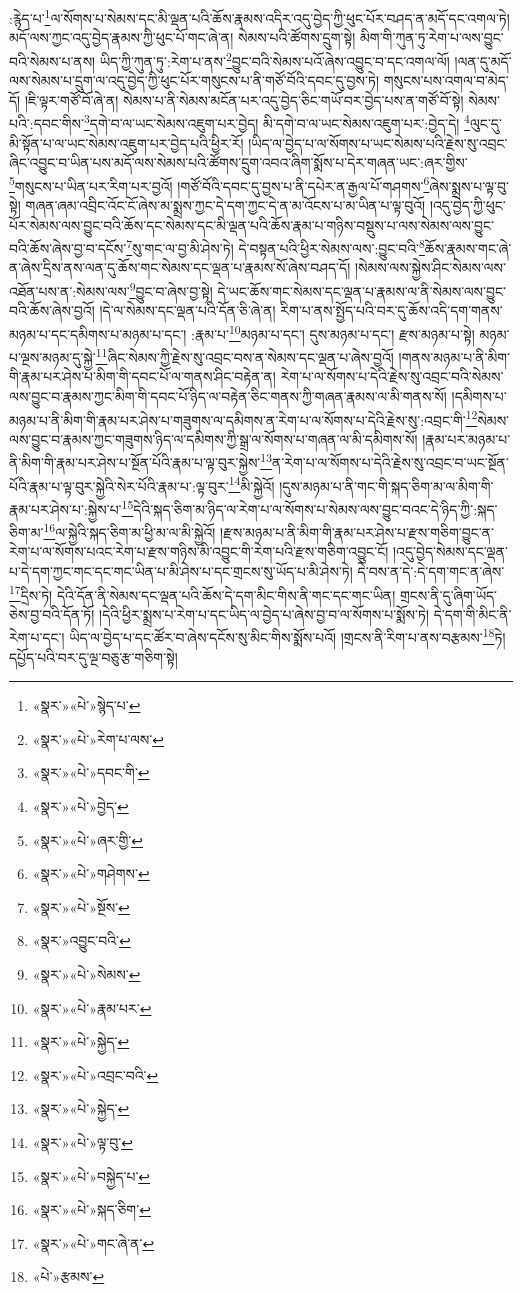 :རྙེད་པ་\footnote{«སྣར་»«པེ་»སྙེད་པ་}ལ་སོགས་པ་སེམས་དང་མི་ལྡན་པའི་ཆོས་རྣམས་འདིར་འདུ་བྱེད་ཀྱི་ཕུང་པོར་བཤད་ན་མདོ་དང་འགལ་ཏེ། མདོ་ལས་ཀྱང་འདུ་བྱེད་རྣམས་ཀྱི་ཕུང་པོ་གང་ཞེ་ན། སེམས་པའི་ཚོགས་དྲུག་སྟེ། མིག་གི་ཀུན་ཏུ་རེག་པ་ལས་བྱུང་བའི་སེམས་པ་ནས། ཡིད་ཀྱི་ཀུན་ཏུ་:རེག་པ་ནས་\footnote{«སྣར་»«པེ་»རེག་པ་ལས་}བྱུང་བའི་སེམས་པའོ་ཞེས་འབྱུང་བ་དང་འགལ་ལོ། །ལན་དུ་མདོ་ལས་སེམས་པ་དྲུག་ལ་འདུ་བྱེད་ཀྱི་ཕུང་པོར་གསུངས་པ་ནི་གཙོ་བོའི་དབང་དུ་བྱས་ཏེ། གསུངས་པས་འགལ་བ་མེད་དོ། །ཇི་ལྟར་གཙོ་བོ་ཞེ་ན། སེམས་པ་ནི་སེམས་མངོན་པར་འདུ་བྱེད་ཅིང་གཡོ་བར་བྱེད་པས་ན་གཙོ་བོ་སྟེ། སེམས་པའི་:དབང་གིས་\footnote{«སྣར་»«པེ་»དབང་གི་}དགེ་བ་ལ་ཡང་སེམས་འཇུག་པར་བྱེད། མི་དགེ་བ་ལ་ཡང་སེམས་འཇུག་པར་:བྱེད་དེ། \footnote{«སྣར་»«པེ་»བྱེད་}ལུང་དུ་མི་སྟོན་པ་ལ་ཡང་སེམས་འཇུག་པར་བྱེད་པའི་ཕྱིར་རོ། །ཡིད་ལ་བྱེད་པ་ལ་སོགས་པ་ཡང་སེམས་པའི་རྗེས་སུ་འབྲང་ཞིང་འབྱུང་བ་ཡིན་པས་མདོ་ལས་སེམས་པའི་ཚོགས་དྲུག་འབའ་ཞིག་སྨོས་པ་དེར་གཞན་ཡང་:ཞར་གྱིས་\footnote{«སྣར་»«པེ་»ཞར་གྱི་}གསུངས་པ་ཡིན་པར་རིག་པར་བྱའོ། །གཙོ་བོའི་དབང་དུ་བྱས་པ་ནི་དཔེར་ན་རྒྱལ་པོ་གཤགས་\footnote{«སྣར་»«པེ་»གཤེགས་}ཞེས་སྨྲས་པ་ལྟ་བུ་སྟེ། གཞན་ཞམ་འབྲིང་འོང་ངོ་ཞེས་མ་སྨྲས་ཀྱང་དེ་དག་ཀྱང་དེ་ན་མ་འོངས་པ་མ་ཡིན་པ་ལྟ་བུའོ། །འདུ་བྱེད་ཀྱི་ཕུང་པོར་སེམས་ལས་བྱུང་བའི་ཆོས་དང་སེམས་དང་མི་ལྡན་པའི་ཆོས་རྣམ་པ་གཉིས་བསྡུས་པ་ལས་སེམས་ལས་བྱུང་བའི་ཆོས་ཞེས་བྱ་བ་དངོས་\footnote{«སྣར་»«པེ་»སྔོས་}སུ་གང་ལ་བྱ་མི་ཤེས་ཏེ། དེ་བསྟན་པའི་ཕྱིར་སེམས་ལས་:བྱུང་བའི་\footnote{«སྣར་»འབྱུང་བའི་}ཆོས་རྣམས་གང་ཞེ་ན་ཞེས་དྲིས་ནས་ལན་དུ་ཆོས་གང་སེམས་དང་ལྡན་པ་རྣམས་སོ་ཞེས་བཤད་དོ། །སེམས་ལས་སྐྱེས་ཤིང་སེམས་ལས་འཐོན་པས་ན་:སེམས་ལས་\footnote{«སྣར་»«པེ་»སེམས་}བྱུང་བ་ཞེས་བྱ་སྟེ། དེ་ཡང་ཆོས་གང་སེམས་དང་ལྡན་པ་རྣམས་ལ་ནི་སེམས་ལས་བྱུང་བའི་ཆོས་ཞེས་བྱའོ། །དེ་ལ་སེམས་དང་ལྡན་པའི་དོན་ཅི་ཞེ་ན། རིག་པ་ནས་སྤྱོད་པའི་བར་དུ་ཆོས་འདི་དག་གནས་མཉམ་པ་དང་དམིགས་པ་མཉམ་པ་དང་། :རྣམ་པ་\footnote{«སྣར་»«པེ་»རྣམ་པར་}མཉམ་པ་དང་། དུས་མཉམ་པ་དང་། རྫས་མཉམ་པ་སྟེ། མཉམ་པ་ལྔས་མཉམ་དུ་སྐྱེ་\footnote{«སྣར་»«པེ་»སྐྱེད་}ཞིང་སེམས་ཀྱི་རྗེས་སུ་འབྲང་བས་ན་སེམས་དང་ལྡན་པ་ཞེས་བྱའོ། །གནས་མཉམ་པ་ནི་མིག་གི་རྣམ་པར་ཤེས་པ་མིག་གི་དབང་པོ་ལ་གནས་ཤིང་བརྟེན་ན། རེག་པ་ལ་སོགས་པ་དེའི་རྗེས་སུ་འབྲང་བའི་སེམས་ལས་བྱུང་བ་རྣམས་ཀྱང་མིག་གི་དབང་པོ་ཉིད་ལ་བརྟེན་ཅིང་གནས་ཀྱི་གཞན་རྣམས་ལ་མི་གནས་སོ། །དམིགས་པ་མཉམ་པ་ནི་མིག་གི་རྣམ་པར་ཤེས་པ་གཟུགས་ལ་དམིགས་ན་རེག་པ་ལ་སོགས་པ་དེའི་རྗེས་སུ་:འབྲང་གི་\footnote{«སྣར་»«པེ་»འབྲང་བའི་}སེམས་ལས་བྱུང་བ་རྣམས་ཀྱང་གཟུགས་ཉིད་ལ་དམིགས་ཀྱི་སྒྲ་ལ་སོགས་པ་གཞན་ལ་མི་དམིགས་སོ། །རྣམ་པར་མཉམ་པ་ནི་མིག་གི་རྣམ་པར་ཤེས་པ་སྔོན་པོའི་རྣམ་པ་ལྟ་བུར་སྐྱེས་\footnote{«སྣར་»«པེ་»སྐྱེད་}ན་རེག་པ་ལ་སོགས་པ་དེའི་རྗེས་སུ་འབྲང་བ་ཡང་སྔོན་པོའི་རྣམ་པ་ལྟ་བུར་སྐྱེའི་སེར་པོའི་རྣམ་པ་:ལྟ་བུར་\footnote{«སྣར་»«པེ་»ལྟ་བུ་}མི་སྐྱེའོ། །དུས་མཉམ་པ་ནི་གང་གི་སྐད་ཅིག་མ་ལ་མིག་གི་རྣམ་པར་ཤེས་པ་:སྐྱེས་པ་\footnote{«སྣར་»«པེ་»བསྐྱེད་པ་}དེའི་སྐད་ཅིག་མ་ཉིད་ལ་རེག་པ་ལ་སོགས་པ་སེམས་ལས་བྱུང་བའང་དེ་ཉིད་ཀྱི་:སྐད་ཅིག་མ་\footnote{«སྣར་»«པེ་»སྐད་ཅིག་}ལ་སྐྱེའི་སྐད་ཅིག་མ་ཕྱི་མ་ལ་མི་སྐྱེའོ། །རྫས་མཉམ་པ་ནི་མིག་གི་རྣམ་པར་ཤེས་པ་རྫས་གཅིག་བྱུང་ན་རེག་པ་ལ་སོགས་པའང་རེག་པ་རྫས་གཉིས་མི་འབྱུང་གི་རེག་པའི་རྫས་གཅིག་འབྱུང་ངོ། །འདུ་བྱེད་སེམས་དང་ལྡན་པ་དེ་དག་ཀྱང་གང་དང་གང་ཡིན་པ་མི་ཤེས་པ་དང་གྲངས་སུ་ཡོད་པ་མི་ཤེས་ཏེ། དེ་བས་ན་དེ་:དེ་དག་གང་ན་ཞེས་\footnote{«སྣར་»«པེ་»གང་ཞེ་ན་}དྲིས་ཏེ། དེའི་དོན་ནི་སེམས་དང་ལྡན་པའི་ཆོས་དེ་དག་མིང་གིས་ནི་གང་དང་གང་ཡིན། གྲངས་ནི་དུ་ཞིག་ཡོད་ཅེས་བྱ་བའི་དོན་ཏོ། །དེའི་ཕྱིར་སྨྲས་པ་རེག་པ་དང་ཡིད་ལ་བྱེད་པ་ཞེས་བྱ་བ་ལ་སོགས་པ་སྨོས་ཏེ། དེ་དག་གི་མིང་ནི་རེག་པ་དང་། ཡིད་ལ་བྱེད་པ་དང་ཚོར་བ་ཞེས་དངོས་སུ་མིང་གིས་སྨོས་པའོ། །གྲངས་ནི་རིག་པ་ནས་བརྩམས་\footnote{«པེ་»རྩམས་}ཏེ། དཔྱོད་པའི་བར་དུ་ལྔ་བཅུ་རྩ་གཅིག་སྟེ། 